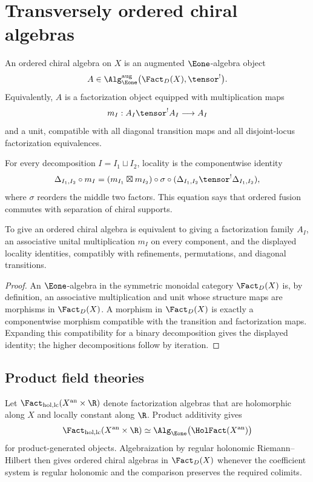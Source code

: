 \chapter{Transversely ordered chiral algebras}
\begin{definition}
An ordered chiral algebra on $X$ is an augmented $\Eone$-algebra object
\[
 A\in \Alg_{\Eone}^{\mathrm{aug}}\bigl(\Fact_D(X),\tensor^!\bigr).
\]
Equivalently, $A$ is a factorization object equipped with multiplication maps
\[
 m_I:A_I\tensor^!A_I\longrightarrow A_I
\]
and a unit, compatible with all diagonal transition maps and all disjoint-locus factorization equivalences.
\end{definition}

For every decomposition $I=I_1\sqcup I_2$, locality is the componentwise identity
\[
 \Delta_{I_1,I_2}\circ m_I
 = (m_{I_1}\boxtimes m_{I_2})\circ\sigma\circ
   (\Delta_{I_1,I_2}\tensor^!\Delta_{I_1,I_2}),
\]
where $\sigma$ reorders the middle two factors. This equation says that ordered fusion commutes with separation of chiral supports.

\begin{theorem}
To give an ordered chiral algebra is equivalent to giving a factorization family $A_I$, an associative unital multiplication $m_I$ on every component, and the displayed locality identities, compatibly with refinements, permutations, and diagonal transitions.
\end{theorem}
\begin{proof}
An $\Eone$-algebra in the symmetric monoidal category $\Fact_D(X)$ is, by definition, an associative multiplication and unit whose structure maps are morphisms in $\Fact_D(X)$. A morphism in $\Fact_D(X)$ is exactly a componentwise morphism compatible with the transition and factorization maps. Expanding this compatibility for a binary decomposition gives the displayed identity; the higher decompositions follow by iteration.
\end{proof}

\section{Product field theories}
Let $\Fact_{\mathrm{hol,lc}}(X^{\mathrm{an}}\times\R)$ denote factorization algebras that are holomorphic along $X$ and locally constant along $\R$. Product additivity gives
\[
 \Fact_{\mathrm{hol,lc}}(X^{\mathrm{an}}\times\R)
 \simeq
 \Alg_{\Eone}\bigl(\HolFact(X^{\mathrm{an}})\bigr)
\]
for product-generated objects. Algebraization by regular holonomic Riemann--Hilbert then gives ordered chiral algebras in $\Fact_D(X)$ whenever the coefficient system is regular holonomic and the comparison preserves the required colimits.

